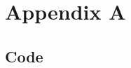 \documentclass{article}
\begin{document}


\citation
\pagebreak
\onecolumn
\begingroup

%

\section{Appendix A}
\subsection{Code}
\endgroup
\end{document}
